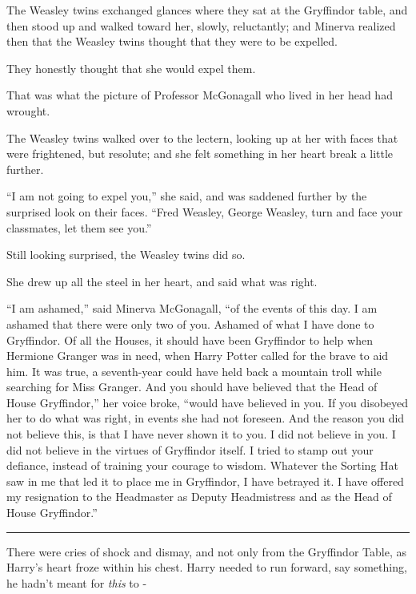 The Weasley twins exchanged glances where they sat at the Gryffindor table, and then stood up and walked toward her, slowly, reluctantly; and Minerva realized then that the Weasley twins thought that they were to be expelled.

They honestly thought that she would expel them.

That was what the picture of Professor McGonagall who lived in her head had wrought.

The Weasley twins walked over to the lectern, looking up at her with faces that were frightened, but resolute; and she felt something in her heart break a little further.

``I am not going to expel you,'' she said, and was saddened further by the surprised look on their faces. ``Fred Weasley, George Weasley, turn and face your classmates, let them see you.''

Still looking surprised, the Weasley twins did so.

She drew up all the steel in her heart, and said what was right.

``I am ashamed,'' said Minerva McGonagall, ``of the events of this day. I am ashamed that there were only two of you. Ashamed of what I have done to Gryffindor. Of all the Houses, it should have been Gryffindor to help when Hermione Granger was in need, when Harry Potter called for the brave to aid him. It was true, a seventh-year could have held back a mountain troll while searching for Miss Granger. And you should have believed that the Head of House Gryffindor,'' her voice broke, ``would have believed in you. If you disobeyed her to do what was right, in events she had not foreseen. And the reason you did not believe this, is that I have never shown it to you. I did not believe in you. I did not believe in the virtues of Gryffindor itself. I tried to stamp out your defiance, instead of training your courage to wisdom. Whatever the Sorting Hat saw in me that led it to place me in Gryffindor, I have betrayed it. I have offered my resignation to the Headmaster as Deputy Headmistress and as the Head of House Gryffindor.''

\begin{center}\rule{3in}{0.4pt}\end{center}

There were cries of shock and dismay, and not only from the Gryffindor Table, as Harry's heart froze within his chest. Harry needed to run forward, say something, he hadn't meant for \emph{this} to -

